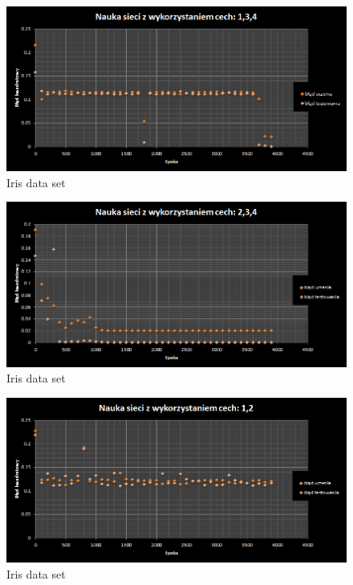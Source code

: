 \documentclass{classrep}
\begin{document}
\begin{figure}[ht]
\centering
			\includegraphics[scale=0.65]{pictures/Iris04.png}
	\caption{Iris data set}
	\label{fig:Iris data set}
\end{figure}

\begin{figure}[ht]
\centering
			\includegraphics[scale=0.65]{pictures/Iris05.png}
	\caption{Iris data set}
	\label{fig:Iris data set}
\end{figure}

\begin{figure}[ht]
\centering
			\includegraphics[scale=0.65]{pictures/Iris06.png}
	\caption{Iris data set}
	\label{fig:Iris data set}
\end{figure}
\end{document}
